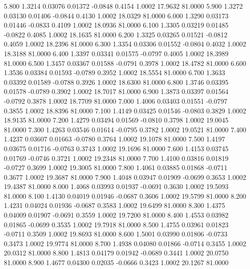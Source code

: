    5.800   1.3214   0.03076   0.01372  -0.0848   0.4154   1.0002  17.9632  81.0000
   5.900   1.3272   0.03130   0.01406  -0.0844   0.4130   1.0002  18.0329  81.0000
   6.000   1.3290   0.03173   0.01446  -0.0833   0.4109   1.0002  18.0936  81.0000
   6.100   1.3305   0.03219   0.01485  -0.0822   0.4085   1.0002  18.1635  81.0000
   6.200   1.3325   0.03265   0.01521  -0.0812   0.4059   1.0002  18.2396  81.0000
   6.300   1.3354   0.03306   0.01552  -0.0804   0.4032   1.0002  18.3188  81.0000
   6.400   1.3397   0.03341   0.01575  -0.0797   0.4005   1.0002  18.3989  81.0000
   6.500   1.3457   0.03367   0.01588  -0.0791   0.3978   1.0002  18.4782  81.0000
   6.600   1.3536   0.03384   0.01593  -0.0789   0.3952   1.0002  18.5554  81.0000
   6.700   1.3633   0.03392   0.01589  -0.0788   0.3926   1.0002  18.6300  81.0000
   6.800   1.3746   0.03395   0.01578  -0.0789   0.3902   1.0002  18.7017  81.0000
   6.900   1.3873   0.03397   0.01564  -0.0792   0.3878   1.0002  18.7709  81.0000
   7.000   1.4006   0.03403   0.01551  -0.0797   0.3855   1.0002  18.8396  81.0000
   7.100   1.4149   0.03425   0.01546  -0.0803   0.3829   1.0002  18.9135  81.0000
   7.200   1.4279   0.03494   0.01569  -0.0810   0.3798   1.0002  19.0045  81.0000
   7.300   1.4263   0.03546   0.01614  -0.0795   0.3782   1.0002  19.0521  81.0000
   7.400   1.4237   0.03607   0.01663  -0.0780   0.3764   1.0002  19.1078  81.0000
   7.500   1.4197   0.03675   0.01716  -0.0763   0.3743   1.0002  19.1696  81.0000
   7.600   1.4153   0.03745   0.01769  -0.0746   0.3721   1.0002  19.2348  81.0000
   7.700   1.4100   0.03816   0.01819  -0.0727   0.3699   1.0002  19.3005  81.0000
   7.800   1.4061   0.03885   0.01868  -0.0711   0.3677   1.0002  19.3687  81.0000
   7.900   1.4048   0.03947   0.01909  -0.0699   0.3653   1.0002  19.4387  81.0000
   8.000   1.4068   0.03993   0.01937  -0.0691   0.3630   1.0002  19.5093  81.0000
   8.100   1.4130   0.04019   0.01946  -0.0687   0.3606   1.0002  19.5799  81.0000
   8.200   1.4231   0.04024   0.01936  -0.0687   0.3583   1.0002  19.6499  81.0000
   8.300   1.4375   0.04009   0.01907  -0.0691   0.3559   1.0002  19.7200  81.0000
   8.400   1.4553   0.03982   0.01865  -0.0699   0.3535   1.0002  19.7918  81.0000
   8.500   1.4755   0.03961   0.01823  -0.0711   0.3509   1.0002  19.8693  81.0000
   8.600   1.5001   0.03990   0.01806  -0.0733   0.3473   1.0002  19.9774  81.0000
   8.700   1.4938   0.04080   0.01866  -0.0714   0.3455   1.0002  20.0312  81.0000
   8.800   1.4813   0.04179   0.01942  -0.0689   0.3441   1.0002  20.0750  81.0000
   8.900   1.4677   0.04300   0.02035  -0.0666   0.3423   1.0002  20.1267  81.0000
